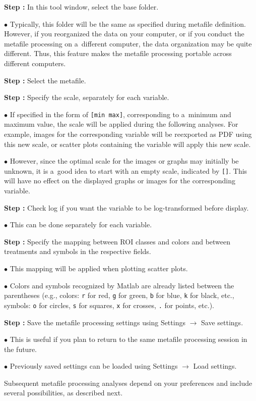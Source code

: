 \documentclass[a4paper, 11pt]{article}
\newcommand{\ttt}[1]{\texttt{#1}}
\newcommand{\lans}[1]{{\color{magenta}#1}}
\newcommand{\lanscb}[1]{{\color{darkgreen}#1}}
\newcommand{\lanstf}[1]{{\color{cyan}#1}}
\newcommand\ra{\rightarrow}
\newcounter{step}
\newcommand\s{\addtocounter{step}{1}\vskip5pt\noindent\textbf{Step \thestep:}{ }}
\newcommand\bul{\vskip5pt\noindent$\bullet${ }}
\begin{document}
\s In this tool window, select the \lanstf{base folder}.

\bul Typically, this folder will be the same as specified during metafile definition. However, if you reorganized the data on your computer, or if you conduct the metafile processing on a~different computer, the data organization may be quite different. Thus, this feature makes the metafile processing portable across different computers.

\s Select the \lanstf{metafile}.

\s Specify  the \lanstf{scale}, separately for each variable.

\bul If specified in the form of \ttt{[min max]}, corresponding to a~minimum and maximum value, the scale will be applied during the following analyses. For example, images for the corresponding variable will be reexported as PDF using this new scale, or scatter plots containing the variable will apply this new scale.

\bul However, since the optimal scale for the images or graphs may initially be unknown, it is a~good idea to start with an empty scale, indicated by \ttt{[]}. This will have no effect on the displayed graphs or images for the corresponding variable.

\s Check \lanscb{log} if you want the variable to be log-transformed before display.

\bul This can be done separately for each variable.

\s Specify the mapping between ROI classes and \lanstf{colors} and between treatments and \lanstf{symbols} in the respective fields. 

\bul This mapping will be applied when plotting scatter plots.

\bul Colors and symbols recognized by Matlab are already listed between the parentheses (e.g., colors: \ttt{r} for red, \ttt{g} for green, \ttt{b} for blue, \ttt{k} for black, etc., symbols: \ttt{o} for circles, \ttt{s} for squares, \ttt{x} for crosses, \ttt{.} for points, etc.).

\s Save the metafile processing settings using \lans{Settings} $\ra$ \lans{Save settings}.

\bul This is useful if you plan to return to the same metafile processing session in the future.

\bul Previously saved settings can be loaded using \lans{Settings} $\ra$ \lans{Load settings}.

\vskip5mm\noindent
Subsequent metafile processing analyses depend on your preferences and include several possibilities, as described next. 
\end{document}

